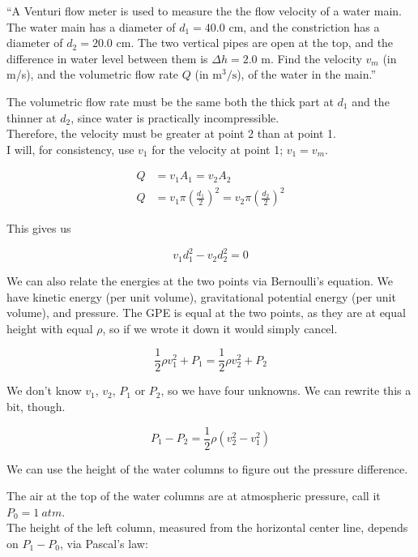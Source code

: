 \documentclass[8.01x]{subfiles}
\begin{document}
``A Venturi flow meter is used to measure the the flow velocity of a water main. The water main has a diameter of $d_1 = 40.0$ cm, and the constriction has a diameter of $d_2 = 20.0$ cm. The two vertical pipes are open at the top, and the difference in water level between them is $\Delta h = 2.0$ m. Find the velocity $v_m$ (in m/s), and the volumetric flow rate $Q$ (in $\text{m}^3/\text{s}$), of the water in the main.''

The volumetric flow rate must be the same both the thick part at $d_1$ and the thinner at $d_2$, since water is practically incompressible.\\
Therefore, the velocity must be greater at point 2 than at point 1.\\
I will, for consistency, use $v_1$ for the velocity at point 1; $v_1 = v_m$.

\begin{align}
Q &= v_1 A_1 = v_2 A_2\\
Q &= v_1 \pi \left(\frac{d_1}{2}\right)^2 = v_2 \pi \left(\frac{d_2}{2}\right)^2
\end{align}

This gives us

\begin{equation}
v_1 d_1^2 - v_2 d_2^2 = 0
\end{equation}

We can also relate the energies at the two points via Bernoulli's equation. We have kinetic energy (per unit volume), gravitational potential energy (per unit volume), and pressure. The GPE is equal at the two points, as they are at equal height with equal $\rho$, so if we wrote it down it would simply cancel.

\begin{equation}
\frac{1}{2} \rho v_1^2 + P_1 = \frac{1}{2} \rho v_2^2 + P_2
\end{equation}

We don't know $v_1$, $v_2$, $P_1$ or $P_2$, so we have four unknowns. We can rewrite this a bit, though.

\begin{equation}
P_1 - P_2 = \frac{1}{2} \rho \left(v_2^2 - v_1^2\right) \label{eq:h10p5_energy}
\end{equation}

We can use the height of the water columns to figure out the pressure difference.

The air at the top of the water columns are at atmospheric pressure, call it $P_0 = \SI{1}{atm}$.\\
The height of the left column, measured from the horizontal center line, depends on $P_1 - P_0$, via Pascal's law:
\end{document}
